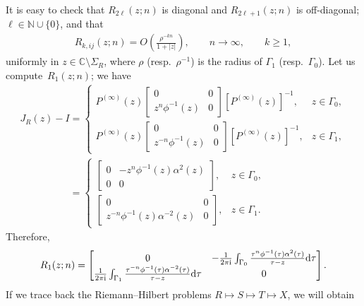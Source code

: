 \documentclass[10pt,a4paper]{amsart}
\numberwithin{equation}{section}
\newcommand{\C}{{\mathbb C}}
\newcommand{\N}{{\mathbb N}}
\newcommand{\al}{\alpha}
\newcommand{\Ga}{\Gamma}
\begin{document}
		It is easy to check that $R_{2\ell}(z;n)$ is diagonal and $R_{2\ell+1}(z;n)$ is off-diagonal; $\ell \in \N \cup \{0\}$, and that
		\begin{gather}\label{R_k's are small}
			R_{k,ij}(z;n) = O \left( \frac{\rho^{-kn}}{1+|z|} \right), \qquad n \to \infty, \qquad k \geq 1,
		\end{gather}
		uniformly in $z\in \C \setminus \Sigma_R$, where $\rho$ \big(resp.\ $\rho^{-1}$\big) is the radius of $\Ga_1$ (resp.\ $\Ga_0$). Let us compute~${R_1(z;n)}$; we have
		\begin{gather*}\label{JR-I}
			J_R(z)-I = \begin{cases}
	P^{(\infty)}(z) \begin{bmatrix}
					0 & 0 \\
					z^n \phi^{-1}(z) & 0 \end{bmatrix} \left[ P^{(\infty)}(z) \right]^{-1}, & z \in \Ga_0, \\[14pt]
			 	P^{(\infty)}(z) \begin{bmatrix}
					0 & 0 \\
					z^{-n} \phi^{-1}(z) & 0 \end{bmatrix} \left[ P^{(\infty)}(z) \right]^{-1}, & z \in \Ga_1,
			\end{cases} \\
\phantom{J_R(z)-I }{} = \begin{cases}
				\begin{bmatrix}
					0 & -z^{n} \phi^{-1}(z)\al^{2}(z) \\
					0 & 0 \end{bmatrix}, & z \in \Ga_0, \\[14pt]
 				\begin{bmatrix}
					0 & 0 \\
					z^{-n} \phi^{-1}(z)\al^{-2}(z) & 0 \end{bmatrix}, & z \in \Ga_1.
			\end{cases}
		\end{gather*}
		Therefore,
		\begin{gather}\label{R1}
			R_1(z;n)= \begin{bmatrix}
				0 & -\tfrac{1}{2\pi {\rm i}}\int_{\Ga_0} \tfrac{\tau^{n} \phi^{-1}(\tau)\al^{2}(\tau)}{\tau-z}{\rm d}\tau \\
 \frac{1}{2\pi {\rm i}}\int_{\Ga_1} \tfrac{\tau^{-n} \phi^{-1}(\tau)\al^{-2}(\tau)}{\tau-z}{\rm d}\tau
				& 0 \end{bmatrix}.
		\end{gather}
		If we trace back the Riemann--Hilbert problems $R \mapsto S \mapsto T \mapsto X $, we will obtain
\end{document}
